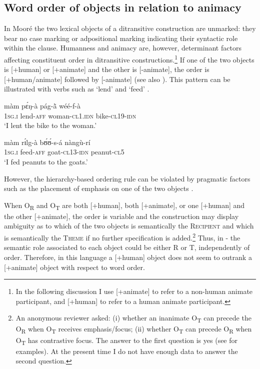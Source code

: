 \documentclass[output=paper]{langsci/langscibook}
\begin{document}
\subsection{Word order of objects in relation to animacy}\label{§4.2:word.pacchiarotti}

In Mooré the two lexical objects of a ditransitive construction are unmarked: they bear no case marking or adpositional marking indicating their syntactic role within the clause. Humanness and animacy are, however, determinant factors affecting constituent order in ditransitive constructions.\footnote{In the following discussion I use [+animate] to refer to a non-human animate participant, and [+human] to refer to a human animate participant.} If one of the two objects is [+human] or [+animate] and the other is [-animate], the order is [+human/animate] followed by [-animate] (see also \citealt[394]{canu1974}). This pattern can be illustrated with verbs such as `lend'  and `feed' .

\ea
\label{ex:14.pacchiarotti}
\gll màm    pɛ́ŋ-à         pág-\`{ã}      wéé-f-à\\
\textsc{1sg.i}    lend-\textsc{aff}        woman-\textsc{cl1.idn}  bike-\textsc{cl19-idn}\\
\glt `I lent the bike to the woman.'
\z

\ea
\label{ex:15.pacchiarotti}
\gll màm    rɪ́lg-à      bʊ́ʊ́-s-á    nàngù-rí \\
\textsc{1sg.i}    feed-\textsc{aff}    goat-\textsc{cl13-idn}  peanut-\textsc{cl5}\\
\glt `I fed peanuts to the goats.'
\z

However, the hierarchy-based ordering rule can be violated by pragmatic factors such as the placement of emphasis on one of the two objects \citep[375]{kabore1985}.

When O\textsubscript{R} and O\textsubscript{T} are both [+human], both [+animate], or one [+human] and the other [+animate],  the order is variable and the construction may display ambiguity as to which of the two objects is semantically the \textsc{Recipient} and which is semantically the \textsc{Theme} if no further specification is added.\footnote{An anonymous reviewer asked: (i) whether an inanimate O\textsubscript{T} can precede the O\textsubscript{R} when O\textsubscript{T} receives emphasis/focus; (ii) whether O\textsubscript{T} can precede O\textsubscript{R} when O\textsubscript{T} has contrastive focus. The answer to the first question is yes (see \citealt[375]{kabore1985} for examples). At the present time I do not have enough data to answer the second question.} Thus, in - the semantic role associated to each object could be either R or T, independently of order. Therefore, in this language a [+human] object does not seem to outrank a [+animate] object with respect to word order.
\end{document}
